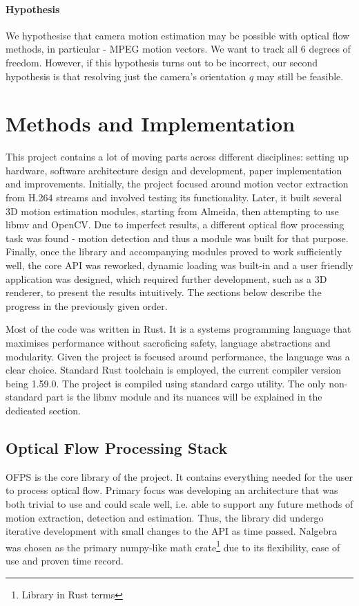 \documentclass[11pt,english]{report}
\begin{document}
\subsubsection{Hypothesis}

We hypothesise that camera motion estimation may be possible with optical flow methods, in particular - MPEG motion vectors. We want to track all 6 degrees of freedom. However, if this hypothesis turns out to be incorrect, our second hypothesis is that resolving just the camera's orientation $q$ may still be feasible.

\chapter{Methods and Implementation}

This project contains a lot of moving parts across different disciplines: setting up hardware, software architecture design and development, paper implementation and improvements. Initially, the project focused around motion vector extraction from H.264 streams and involved testing its functionality. Later, it built several 3D motion estimation modules, starting from Almeida, then attempting to use libmv and OpenCV. Due to imperfect results, a different optical flow processing task was found - motion detection and thus a module was built for that purpose. Finally, once the library and accompanying modules proved to work sufficiently well, the core API was reworked, dynamic loading was built-in and a user friendly application was designed, which required further development, such as a 3D renderer, to present the results intuitively. The sections below describe the progress in the previously given order.

Most of the code was written in Rust. It is a systems programming language that maximises performance without sacroficing safety, language abstractions and modularity. Given the project is focused around performance, the language was a clear choice. Standard Rust toolchain is employed, the current compiler version being 1.59.0. The project is compiled using standard cargo utility. The only non-standard part is the libmv module and its nuances will be explained in the dedicated section.

\section{Optical Flow Processing Stack}

OFPS is the core library of the project. It contains everything needed for the user to process optical flow. Primary focus was developing an architecture that was both trivial to use and could scale well, i.e. able to support any future methods of motion extraction, detection and estimation. Thus, the library did undergo iterative development with small changes to the API as time passed. Nalgebra was chosen as the primary numpy-like math crate\footnote{Library in Rust terms} due to its flexibility, ease of use and proven time record.
\end{document}
